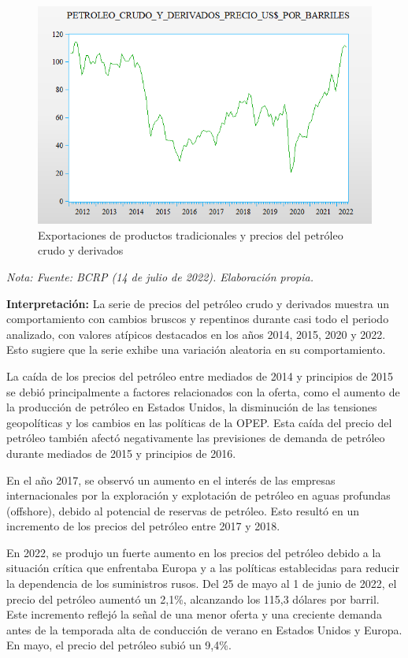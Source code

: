 \documentclass[
  a4paper,
]{article}
\begin{document}
\begin{figure}

\caption{\label{fig-3}Exportaciones de productos tradicionales y precios
del petróleo crudo y derivados}

{\centering \includegraphics{20230603085638.png}

}

\end{figure}

\emph{Nota: Fuente: BCRP (14 de julio de 2022). Elaboración propia.}

\textbf{Interpretación:} La serie de precios del petróleo crudo y
derivados muestra un comportamiento con cambios bruscos y repentinos
durante casi todo el periodo analizado, con valores atípicos destacados
en los años 2014, 2015, 2020 y 2022. Esto sugiere que la serie exhibe
una variación aleatoria en su comportamiento.

La caída de los precios del petróleo entre mediados de 2014 y principios
de 2015 se debió principalmente a factores relacionados con la oferta,
como el aumento de la producción de petróleo en Estados Unidos, la
disminución de las tensiones geopolíticas y los cambios en las políticas
de la OPEP. Esta caída del precio del petróleo también afectó
negativamente las previsiones de demanda de petróleo durante mediados de
2015 y principios de 2016.

En el año 2017, se observó un aumento en el interés de las empresas
internacionales por la exploración y explotación de petróleo en aguas
profundas (offshore), debido al potencial de reservas de petróleo. Esto
resultó en un incremento de los precios del petróleo entre 2017 y 2018.

En 2022, se produjo un fuerte aumento en los precios del petróleo debido
a la situación crítica que enfrentaba Europa y a las políticas
establecidas para reducir la dependencia de los suministros rusos. Del
25 de mayo al 1 de junio de 2022, el precio del petróleo aumentó un
2,1\%, alcanzando los 115,3 dólares por barril. Este incremento reflejó
la señal de una menor oferta y una creciente demanda antes de la
temporada alta de conducción de verano en Estados Unidos y Europa. En
mayo, el precio del petróleo subió un 9,4\%.
\end{document}
